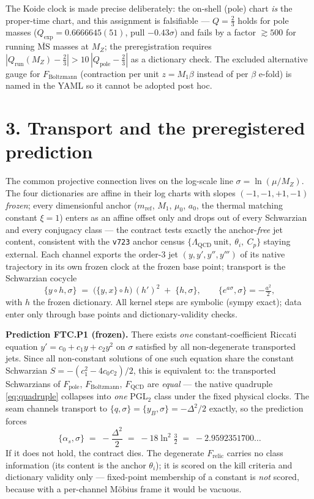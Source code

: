 \documentclass[10pt,a4paper]{article}
\newcommand{\Fpole}{F_{\mathrm{pole}}}
\newcommand{\FB}{F_{\mathrm{Boltzmann}}}
\newcommand{\FQ}{F_{\mathrm{QCD}}}
\newcommand{\FR}{F_{\mathrm{relic}}}
\newcommand{\sch}[2]{\{#1,#2\}}
\begin{document}
The Koide clock is made precise deliberately: the on-shell (pole) chart \emph{is} the proper-time chart,
and this assignment is falsifiable --- $Q=\tfrac23$ holds for pole masses
($Q_{\exp}=0.6666645(51)$, pull $-0.43\sigma$) and fails by a factor $\gtrsim 500$ for running
$\overline{\mathrm{MS}}$ masses at $M_Z$; the preregistration requires
$|Q_{\mathrm{run}}(M_Z)-\tfrac23| > 10\,|Q_{\mathrm{pole}}-\tfrac23|$ as a dictionary check. The excluded
alternative gauge for $\FB$ (contraction per unit $z=M_1\beta$ instead of per $\beta$ e-fold) is named in
the YAML so it cannot be adopted post hoc.

\section*{3. Transport and the preregistered prediction}

The common projective connection lives on the log-scale line $\sigma=\ln(\mu/M_Z)$. The four dictionaries
are affine in their log charts with slopes $(-1,-1,+1,-1)$ \emph{frozen}; every dimensionful anchor
($m_{\mathrm{ref}}$, $M_1$, $\mu_0$, $a_0$, the thermal matching constant $\xi=1$) enters as an affine
offset only and drops out of every Schwarzian and every conjugacy class --- the contract tests exactly the
anchor-\emph{free} jet content, consistent with the \texttt{v723} anchor census
$\{\Lambda_{\mathrm{QCD}}\ \text{unit},\ \theta_i,\ C_p\}$ staying external. Each channel exports the
order-3 jet $(y,y',y'',y''')$ of its native trajectory in its own frozen clock at the frozen base point;
transport is the Schwarzian cocycle
\begin{equation}
\sch{y\circ h}{\sigma} \;=\; \bigl(\sch{y}{x}\circ h\bigr)\,(h')^{2} \;+\; \sch{h}{\sigma},
\qquad
\sch{e^{a\sigma}}{\sigma} = -\tfrac{a^2}{2},
\end{equation}
with $h$ the frozen dictionary. All kernel steps are symbolic (sympy exact); data enter only through base
points and dictionary-validity checks.

\textbf{Prediction FTC.P1 (frozen).} There exists \emph{one} constant-coefficient Riccati equation
$y'=c_0+c_1y+c_2y^2$ on $\sigma$ satisfied by all non-degenerate transported jets. Since all non-constant
solutions of one such equation share the constant Schwarzian $S=-(c_1^2-4c_0c_2)/2$, this is equivalent to:
the transported Schwarzians of $\Fpole$, $\FB$, $\FQ$ are \emph{equal} --- the native quadruple
\eqref{eq:quadruple} collapses into \emph{one} PGL$_2$ class under the fixed physical clocks. The seam
channels transport to $\sch{q}{\sigma}=\sch{y_B}{\sigma}=-\Delta^2/2$ exactly, so the prediction forces
\begin{equation}
\sch{\alpha_s}{\sigma} \;=\; -\frac{\Delta^2}{2} \;=\; -18\ln^2\tfrac32 \;=\; -2.9592351700\ldots
\end{equation}
If it does not hold, the contract dies. The degenerate $\FR$ carries no class information (its content is
the anchor $\theta_i$); it is scored on the kill criteria and dictionary validity only --- fixed-point
membership of a constant is \emph{not} scored, because with a per-channel M\"obius frame it would be
vacuous.
\end{document}
